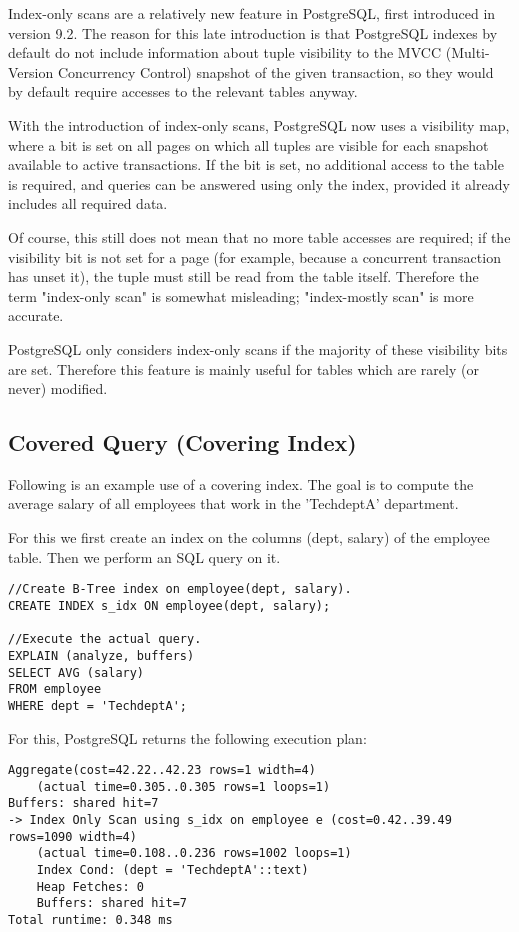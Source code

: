 \documentclass[11pt]{scrartcl}
\begin{document}
Index-only scans are a relatively new feature in PostgreSQL, first introduced in version 9.2.  The reason for this late introduction is that PostgreSQL indexes by default do not include information about tuple visibility to the MVCC (Multi-Version Concurrency Control) snapshot of the given transaction, so they would by default require accesses to the relevant tables anyway.

With the introduction of index-only scans, PostgreSQL now uses a visibility map, where a bit is set on all pages on which all tuples are visible for each snapshot available to active transactions.  If the bit is set, no additional access to the table is required, and queries can be answered using only the index, provided it already includes all required data.

Of course, this still does not mean that no more table accesses are required; if the visibility bit is not set for a page (for example, because a concurrent transaction has unset it), the tuple must still be read from the table itself.  Therefore the term "index-only scan" is somewhat misleading; "index-mostly scan" is more accurate.

PostgreSQL only considers index-only scans if the majority of these visibility bits are set.  Therefore this feature is mainly useful for tables which are rarely (or never) modified.

\subsection{Covered Query (Covering Index)}
Following is an example use of a covering index.  The goal is to compute the average salary of all employees that work in the 'TechdeptA' department.

For this we first create an index on the columns (dept, salary) of the employee table. Then we perform an SQL query on it.

\begin{lstlisting}[style=dbtsql]
//Create B-Tree index on employee(dept, salary).
CREATE INDEX s_idx ON employee(dept, salary);

//Execute the actual query.
EXPLAIN (analyze, buffers)
SELECT AVG (salary)
FROM employee
WHERE dept = 'TechdeptA';
\end{lstlisting}

For this, PostgreSQL returns the following execution plan:

\begin{lstlisting}
Aggregate(cost=42.22..42.23 rows=1 width=4)
    (actual time=0.305..0.305 rows=1 loops=1)
Buffers: shared hit=7
-> Index Only Scan using s_idx on employee e (cost=0.42..39.49 rows=1090 width=4)
    (actual time=0.108..0.236 rows=1002 loops=1)
    Index Cond: (dept = 'TechdeptA'::text)
    Heap Fetches: 0
    Buffers: shared hit=7
Total runtime: 0.348 ms
\end{lstlisting}
\end{document}
